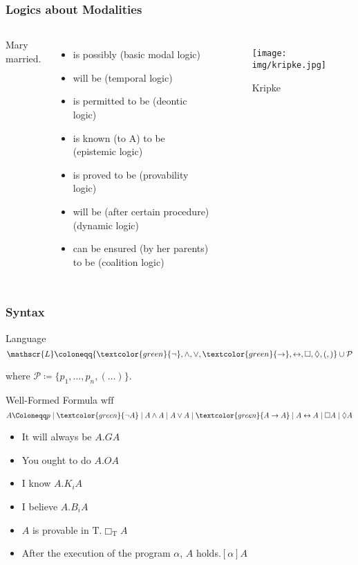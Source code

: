 \documentclass[UTF8,aspectratio=43,11pt,colorlinks,compress,openany]{beamer}%
\begin{document}
\begin{frame}\frametitle{Logics about Modalities}
\begin{columns}
Mary \underline{\phantom{xxxxx}} married.
\begin{itemize}
	\item is possibly (basic modal logic)
	\item will be (temporal logic)
	\item is permitted to be (deontic logic)
	\item is known (to A) to be (epistemic logic)
	\item is proved to be (provability logic)
	\item will be (after certain procedure) (dynamic logic)
	\item can be ensured (by her parents) to be (coalition logic)
\end{itemize}
\begin{figure}[H]
\texttt{[image: img/kripke.jpg]}\caption{Kripke}
\end{figure}
\end{columns}
\end{frame}

\begin{frame}\frametitle{Syntax}
\setlength\abovedisplayskip{0pt}
\setlength\belowdisplayskip{0pt}
	\begin{block}{Language}
		\[\mathscr{L}\coloneqq \{\textcolor{green}{\neg},\wedge,\vee,\textcolor{green}{\to},\leftrightarrow,\Box,\Diamond,(,)\}\cup\mathcal{P}\]
	\end{block}
	where $\mathcal{P}\coloneqq \{p_1,\dots,p_n,(\dots)\}$.
	\begin{block}{Well-Formed Formula $\mathrm{wff}$}
		\[A\Coloneqq p\mid \textcolor{green}{\neg A}\mid A\wedge A\mid A\vee A\mid \textcolor{green}{A\to A}\mid A\leftrightarrow A\mid \Box A\mid \Diamond A\]
	\end{block}
	\begin{itemize}
		\item It will always be $A$.\hfill $GA$
		\item You ought to do $A$.\hfill $O A$
		\item I know $A$.\hfill $K_i A$
		\item I believe $A$.\hfill $B_i A$
		\item $A$ is provable in $\mathrm{T}$.\hfill $\Box_{\mathrm{T}}A$
		\item After the execution of the program $\alpha$, $A$ holds.\hfill $[\alpha]A$
	\end{itemize}
\end{frame}
\end{document}

